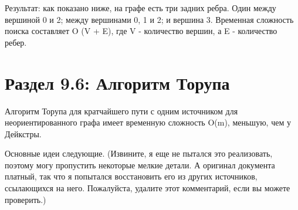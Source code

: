 Результат: как показано ниже, на графе есть три задних ребра. Один между вершиной 0 и 2; между вершинами 0, 1 и 2; и вершина 3. Временная сложность поиска составляет O (V + E), где V - количество вершин, а E - количество ребер.


\section*{Раздел 9.6: Алгоритм Торупа}

Алгоритм Торупа для кратчайшего пути с одним источником для неориентированного графа имеет временную сложность O(m), меньшую, чем у Дейкстры.

\vspace{\baselineskip}

Основные идеи следующие. (Извините, я еще не пытался это реализовать, поэтому могу пропустить некоторые мелкие детали. А оригинал документа платный, так что я попытался восстановить его из других источников, ссылающихся на него. Пожалуйста, удалите этот комментарий, если вы можете проверить.)

